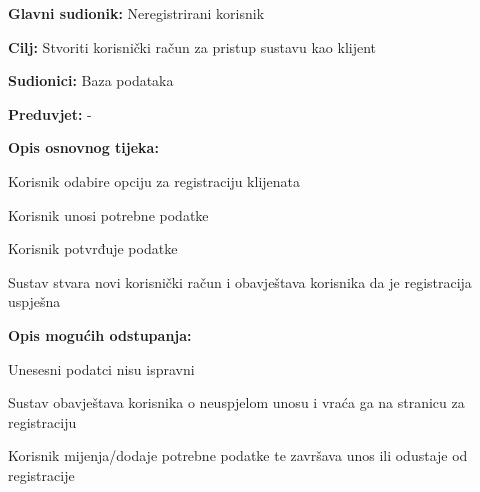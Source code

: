 					\noindent {}
					\begin{packed_item}
	
						\item \textbf{Glavni sudionik:} Neregistrirani korisnik
						\item  \textbf{Cilj:} Stvoriti korisnički račun za pristup sustavu kao klijent
						\item  \textbf{Sudionici:} Baza podataka
						\item  \textbf{Preduvjet:} -
						\item  \textbf{Opis osnovnog tijeka:}
						
						\item[] \begin{packed_enum}
	
							\item Korisnik odabire opciju za registraciju klijenata
							\item Korisnik unosi potrebne podatke
							\item Korisnik potvrđuje podatke
							\item Sustav stvara novi korisnički račun i obavještava korisnika da je registracija uspješna
						\end{packed_enum}
						
						\item  \textbf{Opis mogućih odstupanja:}
						
						\item[] \begin{packed_item}
	
							\item[3.a] Unesesni podatci nisu ispravni
							\item[] \begin{packed_enum}
								
								\item Sustav obavještava korisnika o neuspjelom unosu i vraća ga na stranicu za registraciju
								\item Korisnik mijenja/dodaje potrebne podatke te završava unos ili odustaje od registracije
								
							\end{packed_enum}
							
						\end{packed_item}
					\end{packed_item}
				
